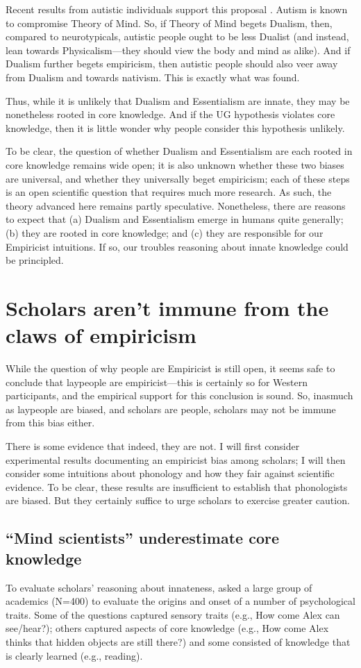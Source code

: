 \documentclass[output=paper,colorlinks,citecolor=brown
]{langscibook}
\begin{document}
Recent results from autistic individuals support this proposal \citep{berent2022autism}. Autism is known to compromise Theory of Mind. So, if Theory of Mind begets Dualism, then, compared to neurotypicals, autistic people ought to be less Dualist (and instead, lean towards Physicalism—they should view the body and mind as alike). And if Dualism further begets empiricism, then autistic people should also veer away from Dualism and towards nativism. This is exactly what was found.

Thus, while it is unlikely that Dualism and Essentialism are innate, they may be nonetheless rooted in core knowledge. And if the UG hypothesis violates core knowledge, then it is little wonder why people consider this hypothesis unlikely. 

To be clear, the question of whether Dualism and Essentialism are each rooted in core knowledge remains wide open; it is also unknown whether these two biases are universal, and whether they universally beget empiricism; each of these steps is an open scientific question that requires much more research. As such, the theory advanced here remains partly speculative. Nonetheless, there are reasons to expect that (a) Dualism and Essentialism emerge in humans quite generally; (b) they are rooted in core knowledge; and (c) they are responsible for our Empiricist intuitions. If so, our troubles reasoning about innate knowledge could be principled.

\section{Scholars aren’t immune from the claws of empiricism}

While the question of why people are Empiricist is still open, it seems safe to conclude that laypeople are empiricist—this is certainly so for Western participants, and the empirical support for this conclusion is sound. So, inasmuch as laypeople are biased, and scholars are people, scholars may not be immune from this bias either. 

There is some evidence that indeed, they are not. I will first consider experimental results documenting an empiricist bias among scholars; I will then consider some intuitions about phonology and how they fair against scientific evidence. To be clear, these results are insufficient to establish that phonologists are biased. But they certainly suffice to urge scholars to exercise greater caution.

\subsection{“Mind scientists” underestimate core knowledge}
To evaluate scholars’ reasoning about innateness, \citet{wang2019empiricism} asked a large group of academics (N=400) to evaluate the origins and onset of a number of psychological traits. Some of the questions captured sensory traits (e.g., How come Alex can see/hear?); others captured aspects of core knowledge (e.g., How come Alex thinks that hidden objects are still there?) and some consisted of knowledge that is clearly learned (e.g., reading). 
\end{document}
